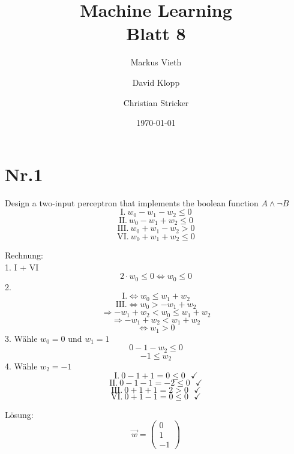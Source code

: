 \documentclass[a4paper,11pt,twoside]{scrartcl}
\title{Machine Learning\\ Blatt 8}
\author{Markus Vieth\and David Klopp\and Christian Stricker}
\date{\today}
\begin{document}
\newcommand{\cor}[1]{\textcolor{red}{\textit{#1}}}
\maketitle
\cleardoublepage
\pagestyle{myheadings}

\newpage

\section*{Nr.1}
Design a two-input perceptron that implements the boolean function $A \land \neg B$
\[\text{I.}~w_0 - w_1 - w_2 \leq 0 \]
\[\text{II.}~w_0 - w_1 + w_2 \leq 0 \]
\[\text{III.}~w_0 + w_1 - w_2 > 0 \]
\[\text{VI.}~w_0 + w_1 + w_2 \leq 0 \]

Rechnung:\\
1. I + VI
\[2 \cdot w_0 \leq 0 \Leftrightarrow w_0 \leq 0 \]
2.
\[\text{I.} \Leftrightarrow w_0 \leq w_1 + w_2\]
\[\text{III.} \Leftrightarrow w_0 > -w_1 + w_2\]
\[\Rightarrow -w_1 + w_2 <  w_0 \leq w_1 + w_2\]
\[\Rightarrow -w_1 + w_2 < w_1 + w_2\]
\[ \Leftrightarrow w_1 > 0\]
3. Wähle $w_0 = 0$ und $w_1 = 1$
\[ 0 -1 -w_2 \leq 0\]
\[ -1 \leq w_2\]
4. Wähle $w_2 = -1$
\[\text{I.}~0 - 1 +1 = 0 \leq 0~~~\checkmark \]
\[\text{II.}~0 - 1 - 1 = -2 \leq 0~~~\checkmark \]
\[\text{III.}~0 + 1 +1 = 2 > 0~~~\checkmark \]
\[\text{VI.}~0 + 1 -1 = 0 \leq 0~~~\checkmark \]

Lösung:
\[
\overset{\rightarrow}{w} = \begin{pmatrix}
           0 \\
           1 \\
           -1
         \end{pmatrix}
\] 
       
\end{document}
